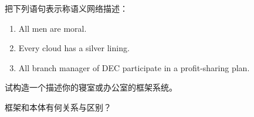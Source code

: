 \begin{question}
把下列语句表示称语义网络描述：
	\begin{enumerate}
		\item All men are moral.
		\item Every cloud has a silver lining.
		\item All branch manager of DEC participate in a profit-sharing plan. 
	\end{enumerate}
\end{question}
\begin{solution}
\end{solution}

\begin{question}
试构造一个描述你的寝室或办公室的框架系统。
\end{question}
\begin{solution}
\end{solution}

\begin{question}
框架和本体有何关系与区别？
\end{question}
\begin{solution}
\end{solution}